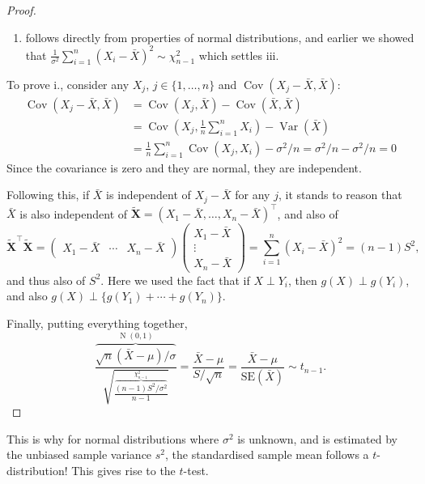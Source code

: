 \documentclass[
]{book}
\providecommand{\tightlist}{%
  \setlength{\itemsep}{0pt}\setlength{\parskip}{0pt}}
\newcommand{\bX}{{\boldsymbol X}}
\DeclareMathOperator{\Var}{Var}
\DeclareMathOperator{\Cov}{Cov}
\DeclareMathOperator{\N}{N}
\theoremstyle{definition}
\theoremstyle{definition}
\theoremstyle{definition}
\theoremstyle{definition}
\theoremstyle{remark}
\begin{document}
\begin{proof}

\begin{enumerate}
\def\labelenumi{\roman{enumi}.}
\setcounter{enumi}{1}
\tightlist
\item
  follows directly from properties of normal distributions, and
  earlier we showed that \(\frac{1}{\sigma^2}\sum_{i=1}^n (X_i - \bar X)^2 \sim \chi^2_{n-1}\) which settles iii.
\end{enumerate}

To prove i., consider any \(X_j\), \(j\in\{1,\dots,n\}\) and
\(\Cov( X_j - \bar X, \bar X)\): \[\begin{aligned}
    \Cov( X_j - \bar X, \bar X)
    &= \Cov( X_j, \bar X) - \Cov(\bar X, \bar X) \\
    &= \Cov\left(X_j, \frac{1}{n}\sum_{i=1}^n X_i\right) - \Var(\bar X) \\
    &= \frac{1}{n} \sum_{i=1}^n \Cov(X_j,X_i) - \sigma^2/n = \sigma^2 /n - \sigma^2 /n = 0
  \end{aligned}\]
Since the covariance is zero and they are normal, they
are independent.

Following this, if \(\bar X\) is independent of \(X_j - \bar X\) for
any \(j\), it stands to reason that \(\bar X\) is also independent of
\(\tilde \bX = (X_1-\bar X,\dots,X_n-\bar X)^\top\), and also of
\[\tilde\bX^\top\tilde\bX = 
    \begin{pmatrix}
      X_1-\bar X &
      \cdots &
      X_n-\bar X
    \end{pmatrix}
    \begin{pmatrix}
      X_1-\bar X \\
      \vdots \\
      X_n-\bar X
    \end{pmatrix}
    = \sum_{i=1}^n (X_i - \bar X)^2 = (n-1)S^2,\] and thus also of
\(S^2\). Here we used the fact that if \(X \perp Y_i\), then \(g(X)\perp g(Y_i)\),
and also \(g(X) \perp \{g(Y_1) + \cdots + g(Y_n)\}\).

Finally, putting everything together,
\[\frac{\overbrace{\sqrt n(\bar X - \mu)/\sigma}^{\N(0,1)}}{\sqrt{\frac{\overbrace{(n-1)S^2/\sigma^2}^{\chi^2_{n-1}}}{n-1}}}
    = \frac{\bar X - \mu}{S/\sqrt{n}}
    = \frac{\bar X - \mu}{\text{SE}(\bar X)} \sim t_{n-1}.\]

\end{proof}

This is why for normal distributions where \(\sigma^2\) is unknown,
and is estimated by the unbiased sample variance \(s^2\), the standardised
sample mean follows a \(t\)-distribution! This gives rise to the \(t\)-test.
\end{document}

